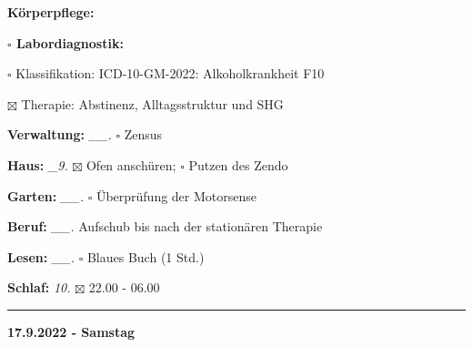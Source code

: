 \documentclass[10pt,a4paper]{article}
\newcommand\prop[1] {{\color {alizarin} {\bf #1}}}        %
\newcommand\rele[1] {{\color {english} \bf {#1}}}         %
\newcommand\mand[1] {{\color {burntorange} {\bf #1}}}     %
\newcommand\ddivide {\vskip -9pt \hrule \vskip 6pt}
\newcommand\bottomspace{\vskip 4pt}
\newcommand\n[1] { {\sl #1.} \hskip 5pt }
\begin{document}
\begin{mdframed}[style=daystyle]
\begin{labeling}{{\mand {Körperpflege:}}}
\begin{minipage}{0.75\textwidth}
\begin{labeling}{{\prop {$\square$ Labordiagnostik:}}}
      \item[$\square$ Klassifikation:]    ICD-10-GM-2022: Alkoholkrankheit F10
      \item[$\boxtimes$ Therapie:]        Abstinenz, Alltagsstruktur und SHG
      \end{labeling}
    \end{minipage}
    \bottomspace
  \item[{\mand {Verwaltung:}}]   \n{\_\_} $\square$ Zensus
  \item[{\mand {Haus:}}]          \n{\_9} $\boxtimes$ Ofen anschüren; $\square$ Putzen des Zendo
  \item[{\mand {Garten:}}]       \n{\_\_} $\square$ Überprüfung der Motorsense
  \item[{\mand {Beruf:}}]        \n{\_\_} Aufschub bis nach der stationären Therapie
  \item[{\mand {Lesen:}}]        \n{\_\_} $\square$ Blaues Buch (1 Std.)
  \item[{\mand {Schlaf:}}]         \n{10} $\boxtimes$ 22.00 - 06.00
  \end{labeling}
\end{mdframed}


\ddivide
{\rele {17.9.2022 - Samstag}}
\end{document}
